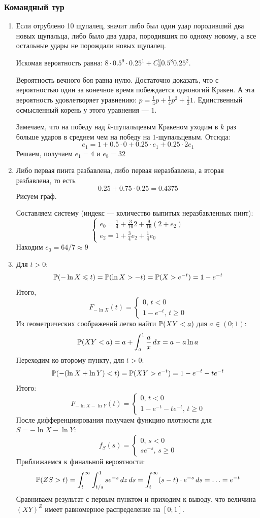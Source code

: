 \subsubsection*{Командный тур}

\begin{enumerate}
\item Если отрублено 10 щупалец, значит либо был один удар породивший два новых
щупальца, либо было два удара, породивших по одному новому, а все остальные удары
не порождали новых щупалец.

Искомая вероятность равна: $8\cdot 0.5^9 \cdot 0.25^1 + C_8^2 0.5^8 0.25^2$.

Вероятность вечного боя равна нулю. Достаточно доказать, что с вероятностью один
за конечное время побеждается одноногий Кракен. А эта вероятность удовлетворяет
уравнению: $p=\frac{1}{4}p + \frac{1}{4}p^2 + \frac{1}{2} 1$. Единственный осмысленный
корень у этого уравнения — $1$.

Замечаем, что на победу над $k$-шупальцевым Кракеном уходим в $k$ раз больше ударов
в среднем чем на победу на $1$-щупальцевым. Отсюда:
\[
e_1=1 + 0.5\cdot 0 + 0.25\cdot e_1 + 0.25 \cdot 2e_1
\]
Решаем, получаем $e_1=4$ и $e_8=32$

\item Либо первая пинта разбавлена, либо первая неразбавлена, а вторая разбавлена,
то есть
\[
0.25 + 0.75\cdot 0.25 =0.4375
\]
Рисуем граф. %

Составляем систему (индекс — количество выпитых неразбавленных пинт):
\[
\begin{cases}
e_0=\frac{1}{4} + \frac{3}{16}2 + \frac{9}{16}(2+e_2) \\
e_2=1+\frac{3}{4}e_2 + \frac{1}{4}e_0
\end{cases}
\]
Находим $e_0=64/7\approx 9$

\item Для $t>0$:
\[
\P(-\ln X \leq t)=\P(\ln X > -t)=\P(X > e^{-t})=1-e^{-t}
\]
Итого,
\[
F_{-\ln X}(t)=\begin{cases}
0, \, t < 0 \\
1-e^{-t}, \, t \geq 0
\end{cases}
\]
Из геометрических соображений легко найти $\P(XY < a)$ для $a\in (0;1)$:
\[
\P(XY < a)=a + \int_a^1 \frac{a}{x} \, dx=a-a\ln a
\]
Переходим ко второму пункту, для $t>0$:
\[
\P(-(\ln X + \ln Y) < t)=\P(XY > e^{-t})= 1-e^{-t} -t e^{-t}
\]
Итого:
\[
F_{-\ln X - \ln Y}(t)=\begin{cases}
0, \, t < 0 \\
1-e^{-t} - te^{-t}, \, t \geq 0
\end{cases}
\]
После дифференциирования получаем функцию плотности для $S=-\ln X - \ln Y$:
\[
f_S(s)=\begin{cases}
0, \, s < 0 \\
se^{-s}, \, s \geq 0
\end{cases}
\]
Приближаемся к финальной вероятности:
\[
\P(ZS > t)= \int_t^{\infty} \int_{t/s}^1  se^{-s} \, dz\, ds=
\int_t^{\infty} (s-t)\cdot e^{-s} \, ds= \ldots = e^{-t}
\]
Сравниваем результат с первым пунктом и приходим к выводу, что величина $(XY)^Z$
имеет равномерное распределение на $[0;1]$.


\end{enumerate}
